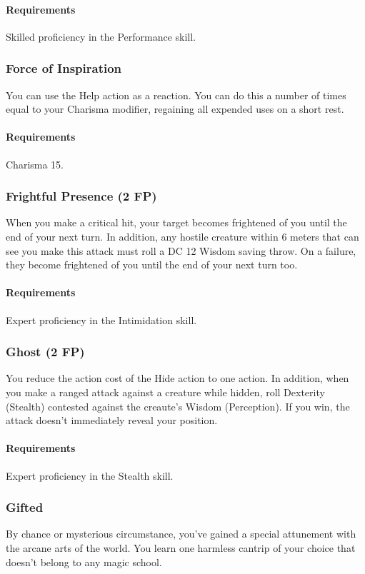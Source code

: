     \paragraph{Requirements} Skilled proficiency in the Performance skill.
\subsubsection{Force of Inspiration} \label{feat::forceofinspiration}
    You can use the Help action as a reaction.
    You can do this a number of times equal to your Charisma modifier, regaining all expended uses on a short rest.
    \paragraph{Requirements} Charisma 15.
\subsubsection{Frightful Presence (2 FP)} \label{feat::frightfulpresence}
    When you make a critical hit, your target becomes frightened of you until the end of your next turn.
    In addition, any hostile creature within 6 meters that can see you make this attack must roll a DC 12 Wisdom saving throw.
    On a failure, they become frightened of you until the end of your next turn too.
    \paragraph{Requirements} Expert proficiency in the Intimidation skill.
\subsubsection{Ghost (2 FP)} \label{feat::ghost}
    You reduce the action cost of the Hide action to one action.
    In addition, when you make a ranged attack against a creature while hidden, roll Dexterity (Stealth) contested against the creaute's Wisdom (Perception).
    If you win, the attack doesn't immediately reveal your position.
    \paragraph{Requirements} Expert proficiency in the Stealth skill.
\subsubsection{Gifted} \label{feat::gifted}
    By chance or mysterious circumstance, you've gained a special attunement with the arcane arts of the world.
    You learn one harmless cantrip of your choice that doesn't belong to any magic school.
